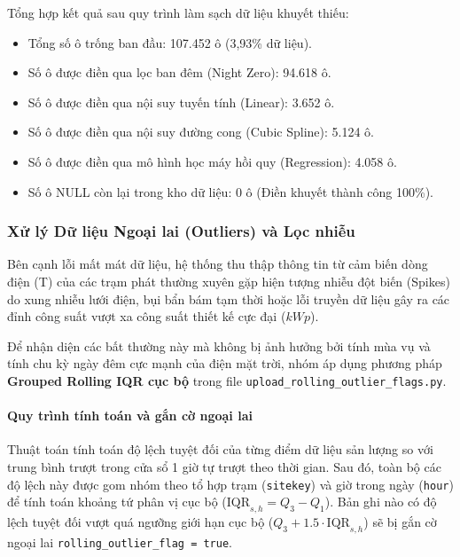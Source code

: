 \documentclass[12pt,a4paper]{article}
\begin{document}
Tổng hợp kết quả sau quy trình làm sạch dữ liệu khuyết thiếu:
\begin{itemize}
    \item Tổng số ô trống ban đầu: 107.452 ô (3,93\% dữ liệu).
    \item Số ô được điền qua lọc ban đêm (Night Zero): 94.618 ô.
    \item Số ô được điền qua nội suy tuyến tính (Linear): 3.652 ô.
    \item Số ô được điền qua nội suy đường cong (Cubic Spline): 5.124 ô.
    \item Số ô được điền qua mô hình học máy hồi quy (Regression): 4.058 ô.
    \item Số ô NULL còn lại trong kho dữ liệu: 0 ô (Điền khuyết thành công 100\%).
\end{itemize}

\subsubsection{Xử lý Dữ liệu Ngoại lai (Outliers) và Lọc nhiễu}
\label{subsec:outlier_processing}

Bên cạnh lỗi mất mát dữ liệu, hệ thống thu thập thông tin từ cảm biến dòng điện (T) của các trạm phát thường xuyên gặp hiện tượng nhiễu đột biến (Spikes) do xung nhiễu lưới điện, bụi bẩn bám tạm thời hoặc lỗi truyền dữ liệu gây ra các đỉnh công suất vượt xa công suất thiết kế cực đại ($kWp$).

Để nhận diện các bất thường này mà không bị ảnh hưởng bởi tính mùa vụ và tính chu kỳ ngày đêm cực mạnh của điện mặt trời, nhóm áp dụng phương pháp \textbf{Grouped Rolling IQR cục bộ} trong file \texttt{upload\_rolling\_outlier\_flags.py}. 

\paragraph{Quy trình tính toán và gắn cờ ngoại lai}
Thuật toán tính toán độ lệch tuyệt đối của từng điểm dữ liệu sản lượng so với trung bình trượt trong cửa sổ 1 giờ tự trượt theo thời gian. Sau đó, toàn bộ các độ lệch này được gom nhóm theo tổ hợp trạm (\texttt{sitekey}) và giờ trong ngày (\texttt{hour}) để tính toán khoảng tứ phân vị cục bộ ($\text{IQR}_{s, h} = Q_3 - Q_1$). Bản ghi nào có độ lệch tuyệt đối vượt quá ngưỡng giới hạn cục bộ ($Q_3 + 1.5 \cdot \text{IQR}_{s, h}$) sẽ bị gắn cờ ngoại lai \texttt{rolling\_outlier\_flag = true}.
\end{document}
